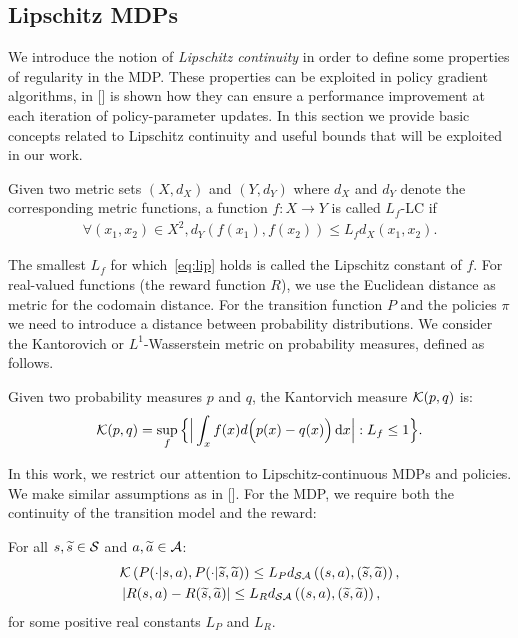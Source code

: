 \subsection{Lipschitz \ac{MDPs}}
We introduce the notion of \emph{Lipschitz continuity} in order to define some properties of regularity in the \ac{MDP}. These properties can be exploited in policy gradient algorithms, in [\citet{pirotta2015policy}] is shown how they can ensure a performance improvement at each iteration of policy-parameter updates. In this section we provide basic concepts related to Lipschitz continuity and useful bounds that will be exploited in our work.
\begin{definition}
Given two metric sets $(X, d_X)$ and $(Y, d_Y)$ where $d_X$ and $d_Y$ denote the corresponding metric functions, a function $f: X \rightarrow Y$ is called $L_f$-\acf{LC} if
\begin{align} \forall(x_1, x_2) \in X^2, d_Y(f(x_1), f(x_2)) \leq L_f d_X(x_1, x_2). \label{eq:lip} \end{align}
\end{definition}
\noindent The smallest $L_f$ for which~\eqref{eq:lip} holds is called the Lipschitz constant of $f$. For real-valued functions (\eg the reward function $R$), we use the Euclidean distance as metric for the codomain distance. For the transition function $P$ and the policies $\pi$ we need to introduce a distance between probability distributions. We consider the Kantorovich or $L^1$-Wasserstein metric on probability measures, defined as follows.
\begin{definition}
Given two probability measures $p$ and $q$, the Kantorvich measure $\mathcal{K}(p, q)$ is:
\begin{align} \mathcal{K}(p, q) = \sup_f\Big\{ \Big| \int_x f(x) d\Big(p(x)-q(x)\Big) \,\mathrm{d} x \Big|: L_f \leq 1 \Big\}. \end{align}
\end{definition}
\noindent In this work, we restrict our attention to Lipschitz-continuous MDPs and policies. We make similar assumptions as in [\cite{pirotta2015policy}]. For the MDP, we require both the continuity of the transition model and the reward:
%
\begin{assumption}\label{ass:lipmdp}
	For all $s,\widetilde{s}\in\mathcal{S}$ and $a,\widetilde{a}\in\mathcal{A}$:
	\begin{align}
	&\mathcal{K}\left(P(\cdot|s,a), P(\cdot| \widetilde{s},\widetilde{a})\right) \leq L_{P}d_{\mathcal{S}\mathcal{A}}\left((s,a),(\widetilde{s},\widetilde{a})\right), \\
	&\left|R(s,a) - R(\widetilde{s},\widetilde{a})\right| \leq L_{R}d_{\mathcal{S}\mathcal{A}}\left((s,a),(\widetilde{s},\widetilde{a})\right),
	\end{align}
	for some positive real constants $L_{P}$ and $L_{R}$.
\end{assumption}
